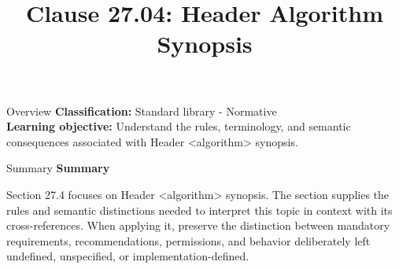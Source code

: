 \documentclass[10pt,letterpaper]{article}
\title{Clause 27.04: Header Algorithm Synopsis}
\author{}
\date{}
\begin{document}
\maketitle
\begin{CornellOverviewBox}{Overview}
\textbf{Classification:} Standard library - Normative\\[2pt]
\textbf{Learning objective:} Understand the rules, terminology, and semantic consequences associated with Header <algorithm> synopsis.
\end{CornellOverviewBox}\begin{CornellSummaryBox}{Summary}
{\sffamily\bfseries\color{Accent} Summary}\par\vspace{3pt}Section 27.4 focuses on Header <algorithm> synopsis. The section supplies the rules and semantic distinctions needed to interpret this topic in context with its cross-references. When applying it, preserve the distinction between mandatory requirements, recommendations, permissions, and behavior deliberately left undefined, unspecified, or implementation-defined.
\end{CornellSummaryBox}
\end{document}
